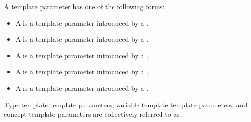 \documentclass{wg21}
\begin{document}
\begin{addedblock}

\pnum
A template parameter has one of the following forms:
\begin{itemize}
\item A  is a template parameter introduced by a .
\item A  is a template parameter introduced by a .
\item A  is a template parameter introduced by a .
\item A  is a template parameter introduced by a .
\item A  is a template parameter introduced by a .
\end{itemize}
Type template template parameters, variable template template parameters, and concept template parameters are collectively referred to as .

\end{addedblock}

\end{document}
